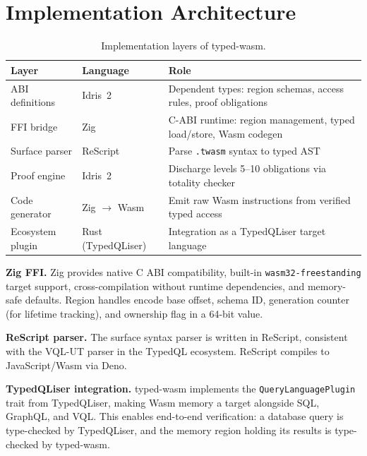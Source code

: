 \documentclass[sigplan,nonacm,screen]{acmart}
\begin{document}
\section{Implementation Architecture}
\label{sec:implementation}

\begin{table}[ht]
\centering
\caption{Implementation layers of typed-wasm.}
\label{tab:architecture}
\begin{tabular}{@{}llp{5cm}@{}}
\toprule
\textbf{Layer} & \textbf{Language} & \textbf{Role} \\
\midrule
ABI definitions & Idris~2 & Dependent types: region schemas, access rules, proof obligations \\
FFI bridge & Zig & C-ABI runtime: region management, typed load/store, Wasm codegen \\
Surface parser & ReScript & Parse \texttt{.twasm} syntax to typed AST \\
Proof engine & Idris~2 & Discharge levels 5--10 obligations via totality checker \\
Code generator & Zig $\to$ Wasm & Emit raw Wasm instructions from verified typed access \\
Ecosystem plugin & Rust (TypedQLiser) & Integration as a TypedQLiser target language \\
\bottomrule
\end{tabular}
\end{table}

\textbf{Zig FFI.}
Zig provides native C ABI compatibility, built-in
\texttt{wasm32-freestanding} target support, cross-compilation without
runtime dependencies, and memory-safe defaults. Region handles encode base
offset, schema ID, generation counter (for lifetime tracking), and
ownership flag in a 64-bit value.

\textbf{ReScript parser.}
The surface syntax parser is written in ReScript, consistent with the
VQL-UT parser in the TypedQL ecosystem. ReScript compiles to
JavaScript/Wasm via Deno.

\textbf{TypedQLiser integration.}
typed-wasm implements the \texttt{QueryLanguagePlugin} trait from
TypedQLiser, making Wasm memory a target alongside SQL, GraphQL, and VQL.
This enables end-to-end verification: a database query is type-checked by
TypedQLiser, and the memory region holding its results is type-checked by
typed-wasm.
\end{document}
